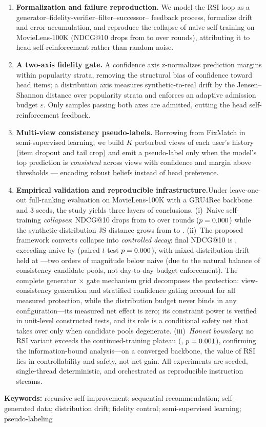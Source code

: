 \begin{enumerate}
\item \textbf{Formalization and failure reproduction.} We model the
RSI loop as a generator--fidelity-verifier--filter--successor--
feedback process, formalize drift and error accumulation, and
reproduce the collapse of naive self-training on MovieLens-100K
(NDCG@10 drops from \ExpNaiveStart{} to \ExpNaiveEnd{} over
\ExpNaiveRounds{} rounds), attributing it to head
self-reinforcement rather than random noise.
\item \textbf{A two-axis fidelity gate.} A confidence axis
z-normalizes prediction margins within popularity strata,
removing the structural bias of confidence toward head items; a
distribution axis measures synthetic-to-real drift by the
Jensen--Shannon distance over popularity strata and enforces an
adaptive admission budget $\varepsilon$. Only samples passing both
axes are admitted, cutting the head self-reinforcement feedback.
\item \textbf{Multi-view consistency pseudo-labels.} Borrowing from
FixMatch in semi-supervised learning, we build $K$ perturbed views
of each user's history (item dropout and tail crop) and emit a
pseudo-label only when the model's top prediction is
\emph{consistent} across views with confidence and margin above
thresholds --- encoding robust beliefs instead of head preference.
\item \textbf{Empirical validation and reproducible
infrastructure.}Under leave-one-out full-ranking evaluation on
MovieLens-100K with a GRU4Rec backbone and 3 seeds, the study
yields three layers of conclusions. (i)~Naive self-training
\emph{collapses}: NDCG@10 drops from \ExpNaiveStart{} to
\ExpNaiveEnd{} over \ExpNaiveRounds{} rounds ($p=0.000{}$)
while the synthetic-distribution JS distance grows from
\NaiveJsFirst{} to \NaiveJsLast{}. (ii)~The proposed framework
converts collapse into \emph{controlled decay}: final NDCG@10 is
\ExpOursEnd{}, exceeding naive by \ExpGainText{} (paired
$t$-test $p=0.000{}$), with mixed-distribution drift held
at \OursJsRange{}---two orders of magnitude below naive (due to
the natural balance of consistency candidate pools, not day-to-day
budget enforcement). The complete generator $\times$ gate
mechanism grid decomposes the protection: view-consistency
generation and stratified confidence gating account for all
measured protection, while the distribution budget never binds
in any configuration---its measured net effect is zero; its
constraint power is verified in unit-level constructed tests, and
its role is a conditional safety net that takes over only when
candidate pools degenerate.
(iii)~\emph{Honest boundary}: no RSI variant exceeds the
continued-training plateau (\BaseNdcg{}, $p=0.001{}$),
confirming the information-bound analysis---on a converged
backbone, the value of RSI lies in controllability and safety,
not net gain. All experiments are seeded, single-thread
deterministic, and orchestrated as reproducible instruction
streams.
\end{enumerate}

\medskip
\noindent\textbf{Keywords:} recursive self-improvement; sequential
recommendation; self-generated data; distribution drift; fidelity
control; semi-supervised learning; pseudo-labeling

